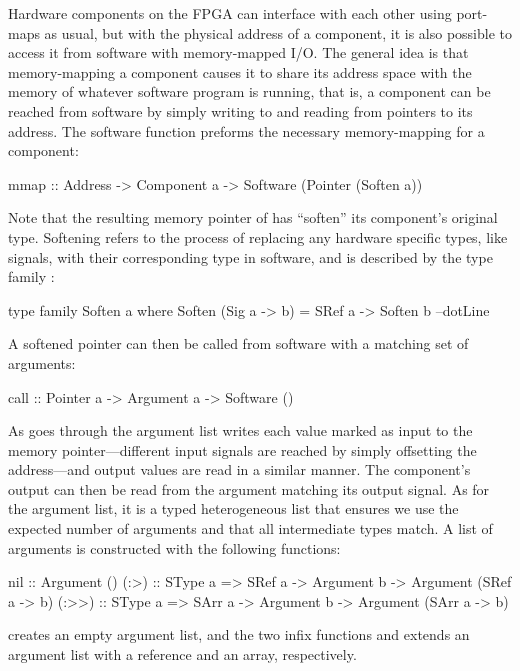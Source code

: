 \documentclass[../paper.tex]{subfiles}
\begin{document}
Hardware components on the FPGA can interface with each other using port-maps as usual, but with the physical address of a component, it is also possible to access it from software with memory-mapped I/O. The general idea is that memory-mapping a component causes it to share its address space with the memory of whatever software program is running, that is, a component can be reached from software by simply writing to and reading from pointers to its address. The software function  preforms the necessary memory-mapping for a component:

\begin{code}
mmap :: Address -> Component a -> Software (Pointer (Soften a))
\end{code}

\noindent Note that the resulting memory pointer of  has ``soften'' its component's original type. Softening refers to the process of replacing any hardware specific types, like signals, with their corresponding type in software, and is described by the type family :

\begin{code}
type family Soften a where
  Soften (Sig a -> b) = SRef a -> Soften b
  --dotLine
\end{code}

A softened pointer can then be called from software with a matching set of arguments:

\begin{code}
call :: Pointer a -> Argument a -> Software ()
\end{code}

\noindent As  goes through the argument list writes each value marked as input to the memory pointer---different input signals are reached by simply offsetting the address---and output values are read in a similar manner. The component's output can then be read from the argument matching its output signal. As for the argument list, it is a typed heterogeneous list that ensures we use the expected number of arguments and that all intermediate types match. A list of arguments is constructed with the following functions:

\begin{code}
nil   :: Argument ()
(:>)  :: SType a => SRef a -> Argument b -> Argument (SRef a -> b)
(:>>) :: SType a => SArr a -> Argument b -> Argument (SArr a -> b)
\end{code}

\noindent {} creates an empty argument list, and the two infix functions \codei{(:>)} and \codei{(:>>)} extends an argument list with a reference and an array, respectively.
\end{document}
